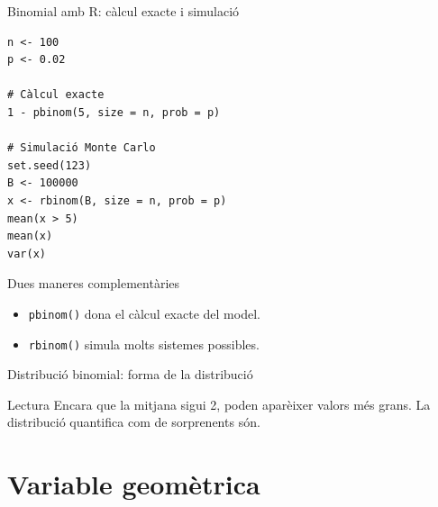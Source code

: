 \documentclass[10pt,aspectratio=169]{beamer}
\newcommand{\Prob}{\mathbb{P}}
\begin{document}
\begin{frame}[fragile]{Binomial amb R: càlcul exacte i simulació}
\begin{lstlisting}
n <- 100
p <- 0.02

# Càlcul exacte
1 - pbinom(5, size = n, prob = p)

# Simulació Monte Carlo
set.seed(123)
B <- 100000
x <- rbinom(B, size = n, prob = p)
mean(x > 5)
mean(x)
var(x)
\end{lstlisting}

\begin{block}{Dues maneres complementàries}
\begin{itemize}
  \item \texttt{pbinom()} dona el càlcul exacte del model.
  \item \texttt{rbinom()} simula molts sistemes possibles.
\end{itemize}
\end{block}
\end{frame}

\begin{frame}{Distribució binomial: forma de la distribució}
\begin{center}
\end{center}
\vspace{-0.1cm}
\begin{alertblock}{Lectura}
Encara que la mitjana sigui 2, poden aparèixer valors més grans. La distribució quantifica com de sorprenents són.
\end{alertblock}
\end{frame}

\section{Variable geomètrica}
\end{document}
